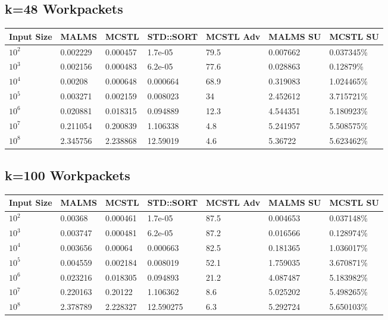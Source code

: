 \documentclass[landscape]{article}
\begin{document}
\subsection*{k=48 Workpackets}
\begin{tabular}{l|l|l|l|l|l|l}
Input Size	& MALMS		& MCSTL		& STD::SORT	& MCSTL Adv	& MALMS SU	& MCSTL SU \\
\hline
$10^2$		& 0.002229	& 0.000457	& 1.7e-05	& 79.5	& 0.007662	& 0.037345\% \\
$10^3$		& 0.002156	& 0.000483	& 6.2e-05	& 77.6	& 0.028863	& 0.12879\% \\
$10^4$		& 0.00208	& 0.000648	& 0.000664	& 68.9	& 0.319083	& 1.024465\% \\
$10^5$		& 0.003271	& 0.002159	& 0.008023	& 34	& 2.452612	& 3.715721\% \\
$10^6$		& 0.020881	& 0.018315	& 0.094889	& 12.3	& 4.544351	& 5.180923\% \\
$10^7$		& 0.211054	& 0.200839	& 1.106338	& 4.8	& 5.241957	& 5.508575\% \\
$10^8$		& 2.345756	& 2.238868	& 12.59019	& 4.6	& 5.36722	& 5.623462\% \\
\end{tabular}


\subsection*{k=100 Workpackets}
\begin{tabular}{l|l|l|l|l|l|l}
Input Size	& MALMS		& MCSTL		& STD::SORT	& MCSTL Adv	& MALMS SU	& MCSTL SU \\
\hline
$10^2$		& 0.00368	& 0.000461	& 1.7e-05	& 87.5	& 0.004653	& 0.037148\% \\
$10^3$		& 0.003747	& 0.000481	& 6.2e-05	& 87.2	& 0.016566	& 0.128974\% \\
$10^4$		& 0.003656	& 0.00064	& 0.000663	& 82.5	& 0.181365	& 1.036017\% \\
$10^5$		& 0.004559	& 0.002184	& 0.008019	& 52.1	& 1.759035	& 3.670871\% \\
$10^6$		& 0.023216	& 0.018305	& 0.094893	& 21.2	& 4.087487	& 5.183982\% \\
$10^7$		& 0.220163	& 0.20122	& 1.106362	& 8.6	& 5.025202	& 5.498265\% \\
$10^8$		& 2.378789	& 2.228327	& 12.590275	& 6.3	& 5.292724	& 5.650103\% \\
\end{tabular}

\end{document}
